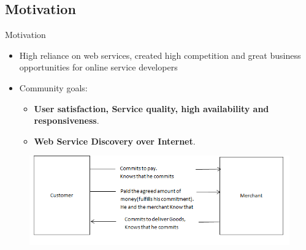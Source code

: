 \documentclass{beamer}
\begin{document}
\subsection{Motivation}
    \begin{frame}{Motivation}
    \begin{itemize}
        \item High reliance on web services, created high competition and great business opportunities for online service developers
        \item Community goals:
        \begin{itemize}
            \item \textbf{User satisfaction, Service quality, high availability and responsiveness}.
            \item \textbf{Web Service Discovery over Internet}.
        \end{itemize}
    \end{itemize}
    \begin{figure}[htbp]
        \centering
        \includegraphics[width=1.0 \columnwidth]{figures/figure7.png}
    \end{figure}
    \end{frame}
\end{document}
